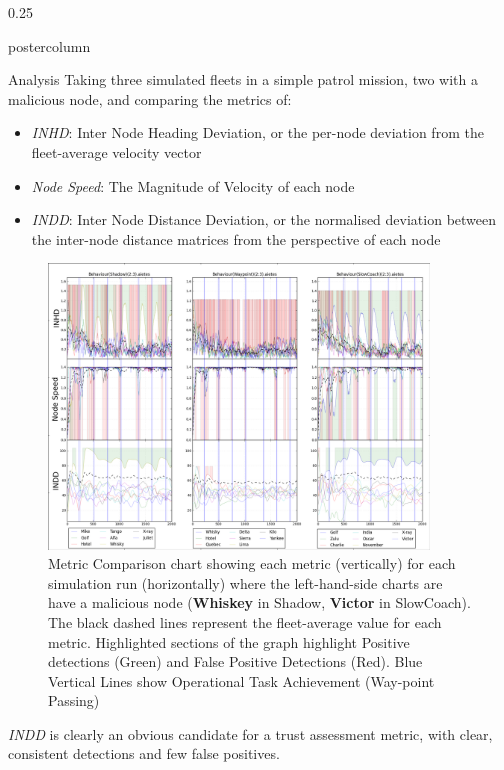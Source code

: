 \documentclass[final,hyperref={pdfpagelabels=false}]{beamer}
\def\colwidth{0.25\linewidth}
\begin{document}
\begin{frame}[fragile]
\begin{columns}[t]
\begin{column}{\colwidth}
\begin{beamercolorbox}[center,wd=\textwidth]{postercolumn}
\begin{minipage}[T]{.98\textwidth}
{%
            \begin{block}{Analysis}
              Taking three simulated fleets in a simple patrol mission, two with a malicious node, and comparing the metrics of:
              \begin{itemize}
                \item \emph{INHD}: Inter Node Heading Deviation, or the per-node deviation from the fleet-average velocity vector
                \item \emph{Node Speed}: The Magnitude of Velocity of each node
                \item \emph{INDD}: Inter Node Distance Deviation, or the normalised deviation between the inter-node distance matrices from the perspective of each node
              \end{itemize}
              \begin{figure}
                \includegraphics[width=0.9\textwidth]{figures/Behaviour Metric Comparison}
                \caption{Metric Comparison chart showing each metric (vertically) for each simulation run (horizontally) where the left-hand-side charts are have a malicious node (\textbf{Whiskey} in Shadow, \textbf{Victor} in SlowCoach). The black dashed lines represent the fleet-average value for each metric. Highlighted sections of the graph highlight Positive detections (Green) and False Positive Detections (Red). Blue Vertical Lines show Operational Task Achievement (Way-point Passing)}
                \label{fig:Behaviour Metric Comparison}
              \end{figure}
              
              \emph{INDD} is clearly an obvious candidate for a trust assessment metric, with clear, consistent detections and few false positives.


\end{block}}
\end{minipage}
\end{beamercolorbox}
\end{column}
\end{columns}
\end{frame}
\end{document}
